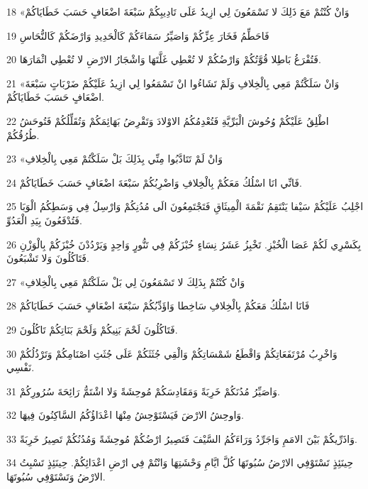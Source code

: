 \par 18 «وَانْ كُنْتُمْ مَعَ ذَلِكَ لا تَسْمَعُونَ لِي ازِيدُ عَلَى تَادِيبِكُمْ سَبْعَةَ اضْعَافٍ حَسَبَ خَطَايَاكُمْ
\par 19 فَاحَطِّمُ فَخَارَ عِزِّكُمْ وَاصَيِّرُ سَمَاءَكُمْ كَالْحَدِيدِ وَارْضَكُمْ كَالنُّحَاسِ
\par 20 فَتُفْرَغُ بَاطِلا قُوَّتُكُمْ وَارْضُكُمْ لا تُعْطِي غَلَّتَهَا وَاشْجَارُ الارْضِ لا تُعْطِي اثْمَارَهَا.
\par 21 «وَانْ سَلَكْتُمْ مَعِي بِالْخِلافِ وَلَمْ تَشَاءُوا انْ تَسْمَعُوا لِي ازِيدُ عَلَيْكُمْ ضَرْبَاتٍ سَبْعَةَ اضْعَافٍ حَسَبَ خَطَايَاكُمْ.
\par 22 اطْلِقُ عَلَيْكُمْ وُحُوشَ الْبَرِّيَّةِ فَتُعْدِمُكُمُ الاوْلادَ وَتَقْرِضُ بَهَائِمَكُمْ وَتُقَلِّلُكُمْ فَتُوحَشُ طُرُقُكُمْ.
\par 23 «وَانْ لَمْ تَتَادَّبُوا مِنِّي بِذَلِكَ بَلْ سَلَكْتُمْ مَعِي بِالْخِلافِ
\par 24 فَانِّي انَا اسْلُكُ مَعَكُمْ بِالْخِلافِ وَاضْرِبُكُمْ سَبْعَةَ اضْعَافٍ حَسَبَ خَطَايَاكُمْ.
\par 25 اجْلِبُ عَلَيْكُمْ سَيْفا يَنْتَقِمُ نَقْمَةَ الْمِيثَاقِ فَتَجْتَمِعُونَ الَى مُدُنِكُمْ وَارْسِلُ فِي وَسَطِكُمُ الْوَبَا فَتُدْفَعُونَ بِيَدِ الْعَدُوِّ.
\par 26 بِكَسْرِي لَكُمْ عَصَا الْخُبْزِ. تَخْبِزُ عَشَرُ نِسَاءٍ خُبْزَكُمْ فِي تَنُّورٍ وَاحِدٍ وَيَرْدُدْنَ خُبْزَكُمْ بِالْوَزْنِ فَتَاكُلُونَ وَلا تَشْبَعُونَ.
\par 27 «وَانْ كُنْتُمْ بِذَلِكَ لا تَسْمَعُونَ لِي بَلْ سَلَكْتُمْ مَعِي بِالْخِلافِ
\par 28 فَانَا اسْلُكُ مَعَكُمْ بِالْخِلافِ سَاخِطا وَاؤَدِّبُكُمْ سَبْعَةَ اضْعَافٍ حَسَبَ خَطَايَاكُمْ
\par 29 فَتَاكُلُونَ لَحْمَ بَنِيكُمْ وَلَحْمَ بَنَاتِكُمْ تَاكُلُونَ.
\par 30 وَاخْرِبُ مُرْتَفَعَاتِكُمْ وَاقْطَعُ شَمْسَاتِكُمْ وَالْقِي جُثَثَكُمْ عَلَى جُثَثِ اصْنَامِكُمْ وَتَرْذُلُكُمْ نَفْسِي.
\par 31 وَاصَيِّرُ مُدُنَكُمْ خَرِبَةً وَمَقَادِسَكُمْ مُوحِشَةً وَلا اشْتَمُّ رَائِحَةَ سُرُورِكُمْ.
\par 32 وَاوحِشُ الارْضَ فَيَسْتَوْحِشُ مِنْهَا اعْدَاؤُكُمُ السَّاكِنُونَ فِيهَا.
\par 33 وَاذَرِّيكُمْ بَيْنَ الامَمِ وَاجَرِّدُ وَرَاءَكُمُ السَّيْفَ فَتَصِيرُ ارْضُكُمْ مُوحِشَةً وَمُدُنُكُمْ تَصِيرُ خَرِبَةً.
\par 34 حِينَئِذٍ تَسْتَوْفِي الارْضُ سُبُوتَهَا كُلَّ ايَّامِ وَحْشَتِهَا وَانْتُمْ فِي ارْضِ اعْدَائِكُمْ. حِينَئِذٍ تَسْبِتُ الارْضُ وَتَسْتَوْفِي سُبُوتَهَا.
